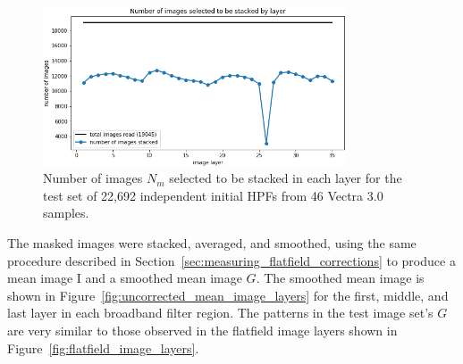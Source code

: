 \documentclass[letterpaper,11pt]{article}
\newcommand{\reffig}[1]{Figure~\ref{#1}}
\newcommand{\refsec}[1]{Section~\ref{#1}}
\newcommand{\Iota}{\mathrm{I}}
\begin{document}
\begin{figure}[!ht]
\centering
\includegraphics[width=0.80\textwidth]{images/results/n_images_stacked_per_layer_test_set}
\caption{\footnotesize Number of images $N_{m}$ selected to be stacked in each layer for the test set of 22,692 independent initial HPFs from 46 Vectra 3.0 samples.}
\label{fig:test_set_n_images_stacked}
\end{figure} 

The masked images were stacked, averaged, and smoothed, using the same procedure described in \refsec{sec:measuring_flatfield_corrections} to produce a mean image $\Iota$ and a smoothed mean image $G$. The smoothed mean image is shown in \reffig{fig:uncorrected_mean_image_layers} for the first, middle, and last layer in each broadband filter region. The patterns in the test image set's $G$ are very similar to those observed in the flatfield image layers shown in \reffig{fig:flatfield_image_layers}. 
\end{document}
